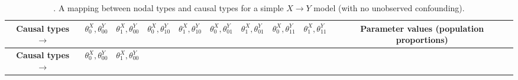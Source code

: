 \documentclass[
  12pt,
]{book}
\begin{document}
\begin{longtable}[]{@{}cccccccccc@{}}
\caption{\label{tab:parammmatrix}. A mapping between nodal types and causal types for a simple \(X \rightarrow Y\) model (with no unobserved confounding).}\tabularnewline
\toprule
\begin{minipage}[b]{0.10\columnwidth}\centering
\textbf{Causal types} \(\rightarrow\)\strut
\end{minipage} & \begin{minipage}[b]{0.07\columnwidth}\centering
\(\theta^X_0,\theta^Y_{00}\)\strut
\end{minipage} & \begin{minipage}[b]{0.07\columnwidth}\centering
\(\theta^X_1,\theta^Y_{00}\)\strut
\end{minipage} & \begin{minipage}[b]{0.07\columnwidth}\centering
\(\theta^X_0,\theta^Y_{10}\)\strut
\end{minipage} & \begin{minipage}[b]{0.07\columnwidth}\centering
\(\theta^X_1,\theta^Y_{10}\)\strut
\end{minipage} & \begin{minipage}[b]{0.07\columnwidth}\centering
\(\theta^X_0,\theta^Y_{01}\)\strut
\end{minipage} & \begin{minipage}[b]{0.07\columnwidth}\centering
\(\theta^X_1,\theta^Y_{01}\)\strut
\end{minipage} & \begin{minipage}[b]{0.07\columnwidth}\centering
\(\theta^X_0,\theta^Y_{11}\)\strut
\end{minipage} & \begin{minipage}[b]{0.07\columnwidth}\centering
\(\theta^X_1,\theta^Y_{11}\)\strut
\end{minipage} & \begin{minipage}[b]{0.10\columnwidth}\centering
Parameter values (population proportions)\strut
\end{minipage}\tabularnewline
\midrule
\endfirsthead
\toprule
\begin{minipage}[b]{0.10\columnwidth}\centering
\textbf{Causal types} \(\rightarrow\)\strut
\end{minipage} & \begin{minipage}[b]{0.07\columnwidth}\centering
\(\theta^X_0,\theta^Y_{00}\)\strut
\end{minipage} & \begin{minipage}[b]{0.07\columnwidth}\centering
\(\theta^X_1,\theta^Y_{00}\)\strut

\end{minipage}
\end{longtable}
\end{document}
